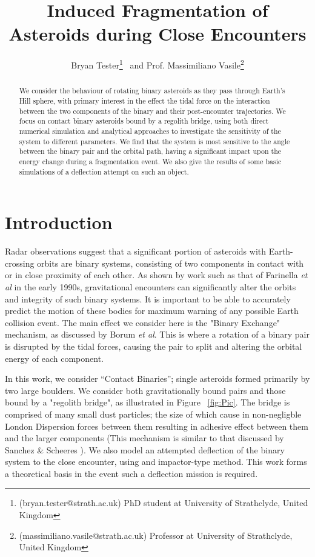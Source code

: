 \documentclass[letterpaper, preprint, paper,11pt]{AAS}	%
\begin{document}
\title{\textsf{\textbf{Induced Fragmentation of Asteroids during Close Encounters}}}
\author{\textsf{Bryan Tester}\thanks{(bryan.tester@strath.ac.uk) PhD student at University of Strathclyde, United Kingdom}
\ and \textsf{Prof. Massimiliano Vasile}\thanks{(massimiliano.vasile@strath.ac.uk) Professor at University of Strathclyde, United Kingdom}}

\maketitle{} 		


\begin{abstract}
We consider the behaviour of rotating binary asteroids as they pass through Earth's Hill sphere, with primary interest in the effect the tidal force on the interaction between the two components of the binary and their post-encounter trajectories. We focus on contact binary asteroids bound by a regolith bridge, using both direct numerical simulation and analytical approaches to investigate the sensitivity of the system to different parameters. We find that the system is most sensitive to the angle between the binary pair and the orbital path, having a significant impact upon the energy change during a fragmentation event. We also give the results of some basic simulations of a deflection attempt on such an object.
\end{abstract}

\section{Introduction}
Radar observations suggest that a significant portion of asteroids with Earth-crossing orbits are binary systems, consisting of two components in contact with or in close proximity of each other. As shown by work such as that of Farinella \textit{et al} \cite{binaryevo} in the early 1990s, gravitational encounters can significantly alter the orbits and integrity of such binary systems. It is important to be able to accurately predict the motion of these bodies for maximum warning of any possible Earth collision event. The main effect we consider here is the "Binary Exchange" mechanism, as discussed by Borum \textit{et al}\cite{exchange}. This is where a rotation of a binary pair is disrupted by the tidal forces, causing the pair to split and altering the orbital energy of each component. 

In this work, we consider “Contact Binaries”; single asteroids formed primarily by two large boulders. We consider both gravitationally bound pairs and those bound by a "regolith bridge", as illustrated in Figure ~\ref{fig:Pic}. The bridge is comprised of many small dust particles; the size of which cause in non-negligble London Dispersion forces between them resulting in adhesive effect between them and the larger components (This mechanism is similar to that discussed by Sanchez \& Scheeres \cite{dustbound}). We also model an attempted deflection of the binary system to the close encounter, using and impactor-type method. This work forms a theoretical basis in the event such a deflection mission is required.
\end{document}
